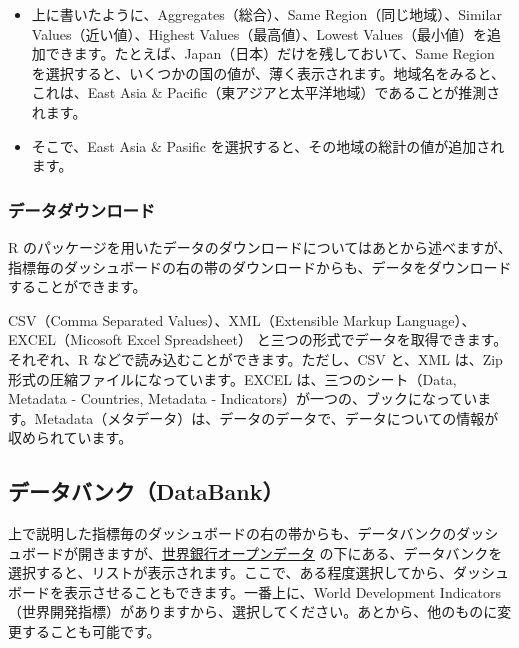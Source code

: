 \documentclass[
  xelatex, ja=standard]{bxjsbook}
\theoremstyle{definition}
\theoremstyle{definition}
\theoremstyle{definition}
\theoremstyle{definition}
\theoremstyle{remark}
\begin{document}
\begin{itemize}
  \begin{itemize}
  \item
    上に書いたように、Aggregates（総合）、Same Region（同じ地域）、Similar Values（近い値）、Highest Values（最高値）、Lowest Values（最小値）を追加できます。たとえば、Japan（日本）だけを残しておいて、Same Region を選択すると、いくつかの国の値が、薄く表示されます。地域名をみると、これは、East Asia \& Pacific（東アジアと太平洋地域）であることが推測されます。
  \item
    そこで、East Asia \& Pasific を選択すると、その地域の総計の値が追加されます。
  \end{itemize}
\end{itemize}

\hypertarget{ux30c7ux30fcux30bfux30c0ux30a6ux30f3ux30edux30fcux30c9}{%
\subsubsection{データダウンロード}\label{ux30c7ux30fcux30bfux30c0ux30a6ux30f3ux30edux30fcux30c9}}

R のパッケージを用いたデータのダウンロードについてはあとから述べますが、指標毎のダッシュボードの右の帯のダウンロードからも、データをダウンロードすることができます。

CSV（Comma Separated Values）、XML（Extensible Markup Language）、EXCEL（Micosoft Excel Spreadsheet） と三つの形式でデータを取得できます。それぞれ、R などで読み込むことができます。ただし、CSV と、XML は、Zip 形式の圧縮ファイルになっています。EXCEL は、三つのシート（Data, Metadata - Countries, Metadata - Indicators）が一つの、ブックになっています。Metadata（メタデータ）は、データのデータで、データについての情報が収められています。

\hypertarget{ux30c7ux30fcux30bfux30d0ux30f3ux30afdatabank}{%
\subsection{データバンク（DataBank）}\label{ux30c7ux30fcux30bfux30d0ux30f3ux30afdatabank}}

上で説明した指標毎のダッシュボードの右の帯からも、データバンクのダッシュボードが開きますが、\href{https://data.worldbank.org}{世界銀行オープンデータ} の下にある、データバンクを選択すると、リストが表示されます。ここで、ある程度選択してから、ダッシュボードを表示させることもできます。一番上に、World Development Indicators（世界開発指標）がありますから、選択してください。あとから、他のものに変更することも可能です。
\end{document}
